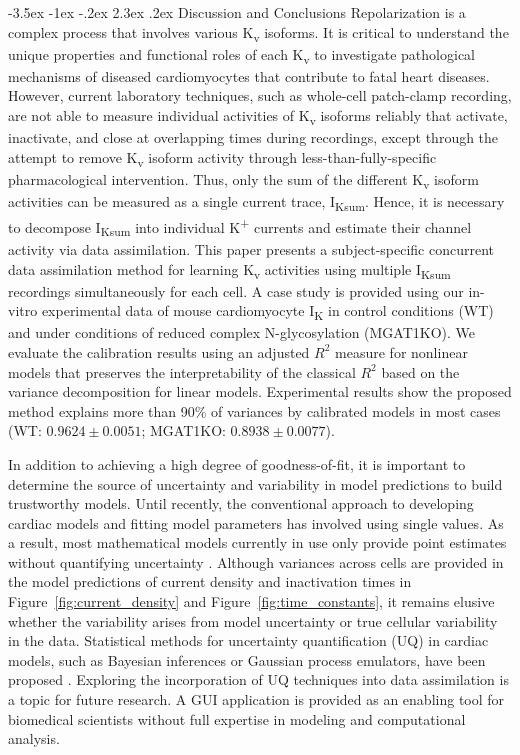 \documentclass[11pt]{article}
\makeatletter
\renewcommand\section{\@startsection {section}{1}{\z@}%
                                   {-3.5ex \@plus -1ex \@minus -.2ex}%
                                   {2.3ex \@plus.2ex}%
                                   {\normalfont\fontfamily{phv}\fontsize{16}{19}\bfseries}}
\makeatother
\begin{document}
\section{Discussion and Conclusions}
Repolarization is a complex process that involves various K\textsubscript{v} isoforms. It is critical to understand the unique properties and functional roles of each K\textsubscript{v} to investigate pathological mechanisms of diseased cardiomyocytes that contribute to fatal heart diseases. However, current laboratory techniques, such as whole-cell patch-clamp recording, are not able to measure individual activities of K\textsubscript{v} isoforms reliably that activate, inactivate, and close at overlapping times during recordings, except through the attempt to remove K\textsubscript{v} isoform activity through less-than-fully-specific pharmacological intervention. Thus, only the sum of the different K\textsubscript{v} isoform activities can be measured as a single current trace, I\textsubscript{Ksum}. Hence, it is necessary to decompose I\textsubscript{Ksum} into individual K\textsuperscript{+} currents and estimate their channel activity via data assimilation. This paper presents a subject-specific concurrent data assimilation method for learning K\textsubscript{v} activities using multiple I\textsubscript{Ksum} recordings simultaneously for each cell. A case study is provided using our in-vitro experimental data of mouse cardiomyocyte I\textsubscript{K} in control conditions (WT) and under conditions of reduced complex N-glycosylation (MGAT1KO). We evaluate the calibration results using an adjusted $R^2$ measure for nonlinear models that preserves the interpretability of the classical $R^2$ based on the variance decomposition for linear models. Experimental results show the proposed method explains more than 90\% of variances by calibrated models in most cases (WT: $0.9624 \pm 0.0051$; MGAT1KO: $0.8938 \pm 0.0077$). 

In addition to achieving a high degree of goodness-of-fit, it is important to determine the source of uncertainty and variability in model predictions to build trustworthy models. Until recently, the conventional approach to developing cardiac models and fitting model parameters has involved using single values. As a result, most mathematical models currently in use only provide point estimates without quantifying uncertainty \citep{johnstone2016uncertainty}. Although variances across cells are provided in the model predictions of current density and inactivation times in Figure~\ref{fig:current_density} and Figure~\ref{fig:time_constants}, it remains elusive whether the variability arises from model uncertainty or true cellular variability in the data. Statistical methods for uncertainty quantification (UQ) in cardiac models, such as Bayesian inferences or Gaussian process emulators, have been proposed \citep{johnstone2016uncertainty,coveney2020sensitivity}. Exploring the incorporation of UQ techniques into data assimilation is a topic for future research. A GUI application is provided as an enabling tool for biomedical scientists without full expertise in modeling and computational analysis.
\end{document}
